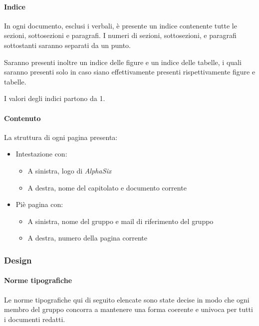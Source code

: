 			\paragraph{Indice}\label{PS:Documentazione:Struttura:Indice}
			In ogni documento, esclusi i verbali, è presente un indice contenente tutte le sezioni, sottosezioni e paragrafi. I numeri di sezioni, sottosezioni,
			e paragrafi sottostanti saranno separati da un punto.\par  
			Saranno presenti inoltre un indice delle
			figure e un indice delle tabelle, i quali saranno presenti solo in caso siano effettivamente presenti rispettivamente
			figure e tabelle.\par
			I valori degli indici partono da 1.

			\paragraph{Contenuto}\label{PS:Documentazione:Struttura:Contenuto}
			La struttura di ogni pagina presenta:
			\begin{itemize}
				\item Intestazione con:
				\begin{itemize}
					\item A sinistra, logo di \emph{AlphaSix}
					\item A destra, nome del capitolato e documento corrente
				\end{itemize}
				\item Piè pagina con:
				\begin{itemize}
					\item A sinistra, nome del gruppo e mail di riferimento del gruppo
					\item A destra, numero della pagina corrente
				\end{itemize}
			\end{itemize}


		\subsubsection{Design}\label{PS:Documentazione:Design}

			\paragraph{Norme tipografiche}\label{PS:Documentazione:Design:NormeT}
			Le norme tipografiche qui di seguito elencate sono state decise in modo che ogni membro del gruppo concorra a mantenere una forma coerente e univoca
			per tutti i documenti redatti.

